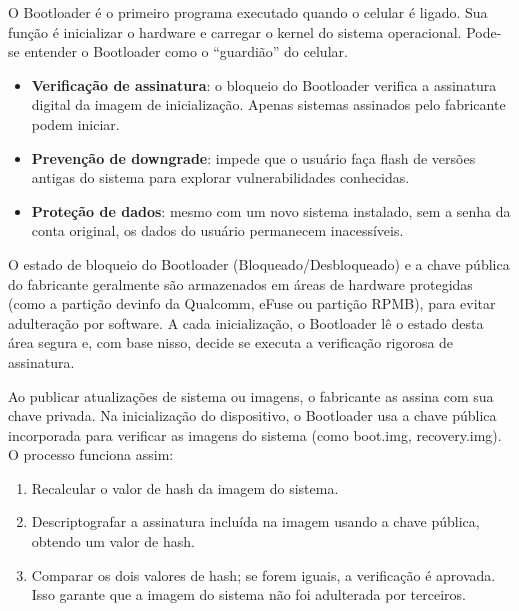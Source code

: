 


O Bootloader é o primeiro programa executado quando o celular é ligado. Sua função é inicializar o hardware e carregar o kernel do sistema operacional. Pode-se entender o Bootloader como o “guardião” do celular.


\begin{itemize}
  \item \textbf{Verificação de assinatura}: o bloqueio do Bootloader verifica a assinatura digital da imagem de inicialização. Apenas sistemas assinados pelo fabricante podem iniciar.
  \item \textbf{Prevenção de downgrade}: impede que o usuário faça flash de versões antigas do sistema para explorar vulnerabilidades conhecidas.
  \item \textbf{Proteção de dados}: mesmo com um novo sistema instalado, sem a senha da conta original, os dados do usuário permanecem inacessíveis.
\end{itemize}


O estado de bloqueio do Bootloader (Bloqueado/Desbloqueado) e a chave pública do fabricante geralmente são armazenados em áreas de hardware protegidas (como a partição devinfo da Qualcomm, eFuse ou partição RPMB), para evitar adulteração por software. A cada inicialização, o Bootloader lê o estado desta área segura e, com base nisso, decide se executa a verificação rigorosa de assinatura.


Ao publicar atualizações de sistema ou imagens, o fabricante as assina com sua chave privada. Na inicialização do dispositivo, o Bootloader usa a chave pública incorporada para verificar as imagens do sistema (como boot.img, recovery.img). O processo funciona assim:

\begin{enumerate}
  \item Recalcular o valor de hash da imagem do sistema.
  \item Descriptografar a assinatura incluída na imagem usando a chave pública, obtendo um valor de hash.
  \item Comparar os dois valores de hash; se forem iguais, a verificação é aprovada. Isso garante que a imagem do sistema não foi adulterada por terceiros.
\end{enumerate}

